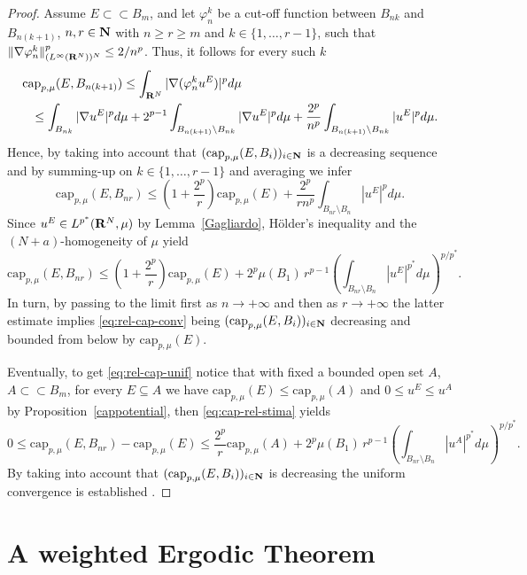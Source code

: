 \documentclass[10pt,reqno]{amsart}
\numberwithin{equation}{section}
\def\N{{\bf N}}
\def\R{{\bf R}}
\def\capmu{\mathrm{cap}_{p,\mu}}
\begin{document}
\begin{proof}
 Assume $E\subset\subset B_m$, and let $\varphi_n^k$ be a 
cut-off function between $B_{nk}$ and $B_{n(k+1)}$, $n,r\in\N$ 
with $n\geq r\geq m$ and $k\in\{1,\ldots,r-1\}$, 
such that $\|\nabla\varphi_n^k\|^p_{(L^\infty(\R^N))^N}\leq 2/n^p$.
Thus, it follows for every such $k$
\begin{eqnarray*}
\lefteqn{ \capmu(E,B_{n(k+1)})\leq\int_{\R^N}|\nabla(\varphi_n^k u^E)|^pd\mu}
\\&&\leq\int_{B_{nk}}|\nabla u^E|^pd\mu+
2^{p-1}\int_{B_{n(k+1)}\setminus B_{nk}}|\nabla u^E|^pd\mu+
\frac{2^p}{n^p}\int_{B_{n(k+1)}\setminus B_{nk}}|u^E|^pd\mu.
\end{eqnarray*}
Hence, by taking into account that $(\capmu(E,B_i))_{i\in\N}$ is a
decreasing sequence and by summing-up on $k\in\{1,\ldots,r-1\}$ and 
averaging we infer
$$
\capmu(E,B_{nr})\leq\left(1+\frac{2^p}r\right)\capmu(E)
+\frac{2^p}{rn^p}\int_{B_{nr}\setminus B_{n}}|u^E|^pd\mu.
$$
Since $u^E\in L^{p^\ast}(\R^N,\mu)$ by Lemma~\ref{Gagliardo},  
H\"older's inequality and the $(N+a)$-homogeneity of $\mu$ yield
\begin{equation}\label{eq:cap-rel-stima}
\capmu(E,B_{nr})\leq\left(1+\frac{2^p}r\right)\capmu(E) 
+2^p\mu(B_1)\,r^{p-1}
\left(\int_{B_{nr}\setminus B_{n}}|u^E|^{p^\ast}d\mu\right)^{p/p^\ast}.
\end{equation}
In turn, by passing to the limit first as $n\to+\infty$ and 
then as $r\to+\infty$ the latter estimate implies \eqref{eq:rel-cap-conv} 
being $(\capmu(E,B_i))_{i\in\N}$ decreasing and bounded from below
by $\capmu(E)$.

Eventually, to get \eqref{eq:rel-cap-unif} notice that
with fixed a bounded open set $A$, $A\subset\subset B_m$,
for every $E\subseteq A$ we have $\capmu(E)\leq\capmu(A)$ and
$0\leq u^E\leq u^A$ by Proposition~\ref{cappotential}, then
\eqref{eq:cap-rel-stima} yields
$$
0\leq \capmu(E,B_{nr})-\capmu(E)\leq\frac{2^p}r\capmu(A)
+2^p\mu(B_1)\,r^{p-1}
\left(\int_{B_{nr}\setminus B_{n}}|u^A|^{p^\ast}d\mu\right)^{p/p^\ast}.
$$
By taking into account that $(\capmu(E,B_i))_{i\in\N}$ is decreasing 
the uniform convergence is established .
\end{proof}



\section{A weighted Ergodic Theorem}\label{weighted-ergodic}
\end{document}
